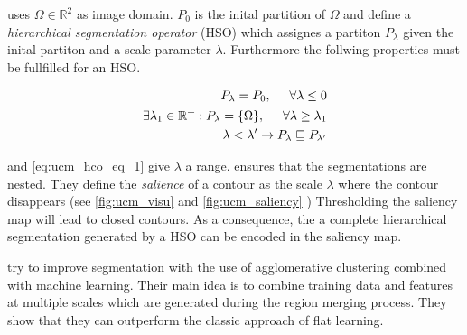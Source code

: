 \citet{ arbelaez_2006_cvpr} uses $\Omega \in \mathbb{R}^2$ as image domain.
$P_0$ is the inital partition of $\Omega$ and define a
\emph{hierarchical segmentation operator} (HSO) which
assignes a partiton $P_\lambda$ given the inital partiton and
a scale parameter $\lambda$.
Furthermore the follwing properties must be fullfilled for an HSO.  


\begin{align} 
P_{\lambda}  =  P_0 ,\hspace{0.5cm}  \forall \lambda \leq 0  \label{eq:ucm_hco_eq_0} \\ 
\exists \lambda_1 \in \mathbb{R}^+  : P_{\lambda}  =  \{ \Omega \} ,\hspace{0.5cm} \forall \lambda \geq \lambda_1  \label{eq:ucm_hco_eq_1} \\
\lambda < \lambda'  \rightarrow  P_{\lambda} \sqsubseteq   P_{\lambda'} \label{eq:ucm_hco_eq_2}
\end{align}


 and \cref{eq:ucm_hco_eq_1}  give $\lambda$ a range.
 ensures that the segmentations are nested.
They define the \emph{salience} of a contour as the scale $\lambda$ where
the contour disappears (see \cref{fig:ucm_visu} and \cref{fig:ucm_saliency} )
Thresholding the saliency map will lead to closed contours.
As a consequence, the a complete hierarchical segmentation
generated by a HSO can be encoded in the saliency map.


\citet{iglesias_2013} try to improve segmentation with
the use of agglomerative clustering combined with machine learning.
Their main idea is to combine training data and features at multiple scales
which are generated during the region merging process.
They show that they can outperform the classic approach
of flat learning.


